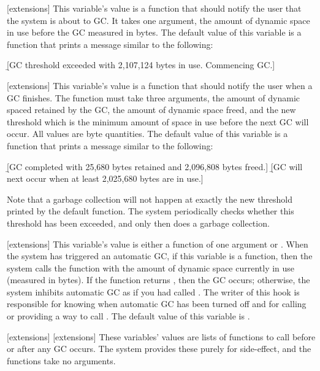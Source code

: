 [extensions]
This variable's value is a function that should notify the user that the system
is about to GC.  It takes one argument, the amount of dynamic space in use
before the GC measured in bytes.  The default value of this variable is a
function that prints a message similar to the following:
\begin{display}
\b{[GC threshold exceeded with 2,107,124 bytes in use.  Commencing GC.]}
\end{display}
\enddefvar

[extensions]
This variable's value is a function that should notify the user when a GC
finishes.  The function must take three arguments, the amount of dynamic spaced
retained by the GC, the amount of dynamic space freed, and the new threshold
which is the minimum amount of space in use before the next GC will occur.  All
values are byte quantities.  The default value of this variable is a function
that prints a message similar to the following:
\begin{display}
\b{[GC completed with 25,680 bytes retained and 2,096,808 bytes freed.]}
\b{[GC will next occur when at least 2,025,680 bytes are in use.]}
\end{display}
\enddefvar

Note that a garbage collection will not happen at exactly the new threshold
printed by the default  function.  The system
periodically checks whether this threshold has been exceeded, and only then
does a garbage collection.

[extensions]
This variable's value is either a function of one argument or \nil.  When the
system has triggered an automatic GC, if this variable is a function, then the
system calls the function with the amount of dynamic space currently in use
(measured in bytes).  If the function returns \nil, then the GC occurs;
otherwise, the system inhibits automatic GC as if you had called
.  The writer of this hook is responsible for knowing when
automatic GC has been turned off and for calling or providing a way to call
.  The default value of this variable is \nil.
\enddefvar

[extensions]
[extensions]
These variables' values are lists of functions to call before or after any GC
occurs.  The system provides these purely for side-effect, and the functions
take no arguments.
\enddefvar


